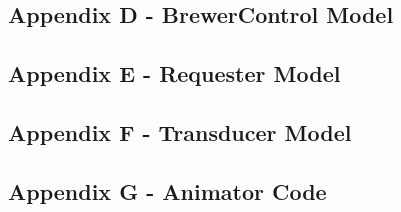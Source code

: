 \documentclass[10pt]{article}
\begin{document}
\subsection{Appendix D - BrewerControl Model}
\begin{scriptsize}

\end{scriptsize}
\newpage
\subsection{Appendix E - Requester Model}
\begin{scriptsize}

\end{scriptsize}
\newpage
\subsection{Appendix F - Transducer Model}
\begin{scriptsize}

\end{scriptsize}
\newpage
\subsection{Appendix G - Animator Code}
\begin{scriptsize}

\end{scriptsize}
\end{document}
